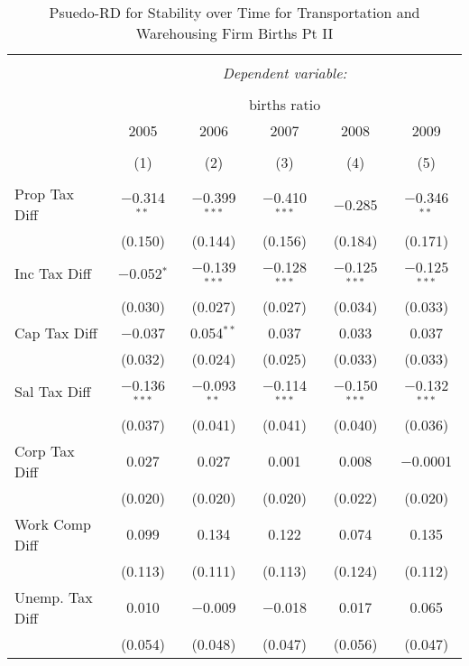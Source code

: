 
\begin{table}[!htbp] \centering 
  \caption{Psuedo-RD for Stability over Time for  Transportation and Warehousing Firm Births Pt II} 
  \label{48-49year} 
\small 
\begin{tabular}{@{\extracolsep{5pt}}lccccc} 
\\[-1.8ex]\hline 
\hline \\[-1.8ex] 
 & \multicolumn{5}{c}{\textit{Dependent variable:}} \\ 
\cline{2-6} 
\\[-1.8ex] & \multicolumn{5}{c}{births ratio} \\ 
 & 2005 & 2006 & 2007 & 2008 & 2009 \\ 
\\[-1.8ex] & (1) & (2) & (3) & (4) & (5)\\ 
\hline \\[-1.8ex] 
 Prop Tax Diff & $-$0.314$^{**}$ & $-$0.399$^{***}$ & $-$0.410$^{***}$ & $-$0.285 & $-$0.346$^{**}$ \\ 
  & (0.150) & (0.144) & (0.156) & (0.184) & (0.171) \\ 
  Inc Tax Diff & $-$0.052$^{*}$ & $-$0.139$^{***}$ & $-$0.128$^{***}$ & $-$0.125$^{***}$ & $-$0.125$^{***}$ \\ 
  & (0.030) & (0.027) & (0.027) & (0.034) & (0.033) \\ 
  Cap Tax Diff & $-$0.037 & 0.054$^{**}$ & 0.037 & 0.033 & 0.037 \\ 
  & (0.032) & (0.024) & (0.025) & (0.033) & (0.033) \\ 
  Sal Tax Diff & $-$0.136$^{***}$ & $-$0.093$^{**}$ & $-$0.114$^{***}$ & $-$0.150$^{***}$ & $-$0.132$^{***}$ \\ 
  & (0.037) & (0.041) & (0.041) & (0.040) & (0.036) \\ 
  Corp Tax Diff & 0.027 & 0.027 & 0.001 & 0.008 & $-$0.0001 \\ 
  & (0.020) & (0.020) & (0.020) & (0.022) & (0.020) \\ 
  Work Comp Diff & 0.099 & 0.134 & 0.122 & 0.074 & 0.135 \\ 
  & (0.113) & (0.111) & (0.113) & (0.124) & (0.112) \\ 
  Unemp. Tax Diff & 0.010 & $-$0.009 & $-$0.018 & 0.017 & 0.065 \\ 
  & (0.054) & (0.048) & (0.047) & (0.056) & (0.047) \\ 

\end{tabular}
\end{table}
